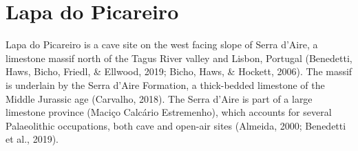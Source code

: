 \documentclass[12pt,twoside]{reedthesis}
\begin{document}
\hypertarget{lapa-do-picareiro}{%
\section{Lapa do Picareiro}\label{lapa-do-picareiro}}

Lapa do Picareiro is a cave site on the west facing slope of Serra d'Aire, a limestone massif north of the Tagus River valley and Lisbon, Portugal (Benedetti, Haws, Bicho, Friedl, \& Ellwood, 2019; Bicho, Haws, \& Hockett, 2006). The massif is underlain by the Serra d'Aire Formation, a thick-bedded limestone of the Middle Jurassic age (Carvalho, 2018). The Serra d'Aire is part of a large limestone province (Maciço Calcário Estremenho), which accounts for several Palaeolithic occupations, both cave and open-air sites (Almeida, 2000; Benedetti et al., 2019).
\end{document}
